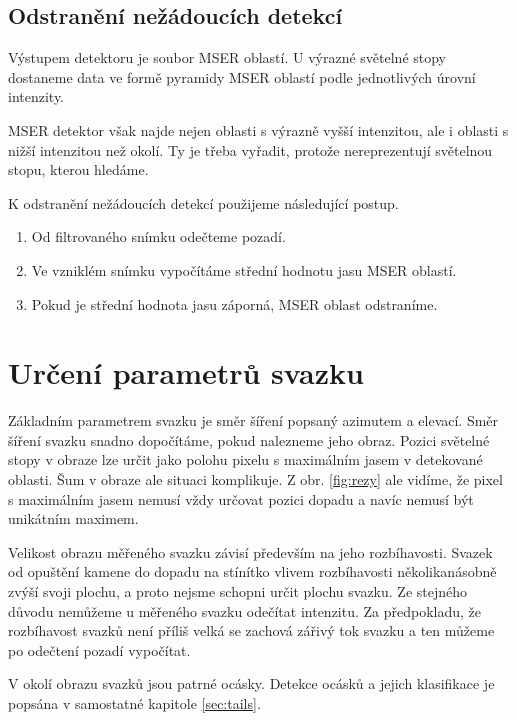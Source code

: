 \subsection{Odstranění nežádoucích detekcí}

Výstupem detektoru je soubor MSER oblastí. U výrazné světelné stopy dostaneme data ve formě pyramidy MSER oblastí podle jednotlivých úrovní intenzity. 

MSER detektor však najde nejen oblasti s výrazně vyšší intenzitou, ale i oblasti s nižší intenzitou než okolí. Ty je třeba vyřadit, protože nereprezentují světelnou stopu, kterou hledáme. 

K odstranění nežádoucích detekcí použijeme následující postup. 

\begin{enumerate}
\item Od filtrovaného snímku odečteme pozadí.

\item Ve vzniklém snímku vypočítáme střední hodnotu jasu MSER oblastí. 

\item Pokud je střední hodnota jasu záporná, MSER oblast odstraníme.  
\end{enumerate}
 	      

\section{Určení parametrů svazku}
\label{sec:beam parameters}
Základním parametrem svazku je směr šíření popsaný azimutem a elevací. Směr šíření svazku snadno dopočítáme, pokud nalezneme jeho obraz. Pozici světelné stopy v obraze lze určit jako polohu pixelu s maximálním jasem v detekované oblasti. Šum v obraze ale situaci komplikuje. Z obr. \ref{fig:rezy} ale vidíme, že pixel s maximálním jasem nemusí vždy určovat pozici dopadu a navíc nemusí být unikátním maximem.

Velikost obrazu měřeného svazku závisí především na jeho rozbíhavosti. Svazek od opuštění kamene do dopadu na stínítko vlivem rozbíhavosti několikanásobně zvýší svoji plochu, a proto nejsme schopni určit plochu svazku. Ze stejného důvodu nemůžeme u měřeného svazku odečítat intenzitu. Za předpokladu, že rozbíhavost svazků není příliš velká se zachová zářivý tok svazku a ten můžeme po odečtení pozadí vypočítat. %

V okolí obrazu svazků jsou patrné ocásky. Detekce ocásků a jejich klasifikace je popsána v samostatné kapitole \ref{sec:tails}.

